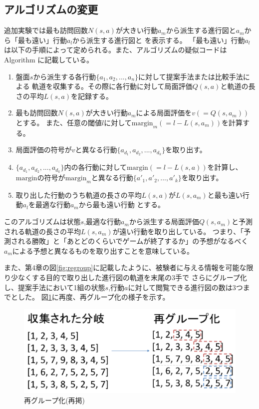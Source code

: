 \subsection{アルゴリズムの変更}
追加実験では最も訪問回数$N(s, a)$が大きい行動$a_m$から派生する進行図と$a_m$から「最も遠い」行動$a_l$から派生する進行図と
を表示する。
「最も遠い」行動$a_l$は以下の手順によって定められる。また、アルゴリズムの疑似コードはAlgorithm\label{alg:myalg-add} に記載している。
\begin{enumerate}
    \item 盤面$s$から派生する各行動$\{a_1, a_2, ..., a_n\}$に対して提案手法または比較手法による
    軌道を収集する。その際に各行動に対して局面評価$Q(s, a)$と軌道の長さの平均$L(s, a)$を記録する。
    \item 最も訪問回数$N(s, a)$が大きい行動$a_m$による局面評価を$v(=Q(s, a_m))$とする。
    また、任意の閾値$l$に対して$\textrm{margin}_m(=l-L(s, a_m))$を計算する。
    \item 局面評価の符号が$v$と異なる行動$\{a_{d_1}, a_{d_2}, ..., a_{d_k}\}$を取り出す。
    \item $\{a_{d_1}, a_{d_2}, ..., a_{d_k}\}$内の各行動に対して$\textrm{margin}(=l-L(s, a))$を計算し、
    $\textrm{margin}$の符号が$\textrm{margin}_m$と異なる行動$\{{a'}_{1}, {a'}_{2}, ..., {a'}_{k}\}$を取り出す。
    \item 取り出した行動のうち軌道の長さの平均$L(s, a)$が$L(s, a_m)$と最も遠い行動$a_l$を最適な行動$a_m$から最も遠い行動
    とする。
\end{enumerate}
このアルゴリズムは状態$s$,最適な行動$a_m$から派生する局面評価$Q(s, a_m)$と予測される軌道の長さの平均$L(s, a_m)$が遠い行動を取り出している。
つまり、「予測される勝敗」と「あとどのくらいでゲームが終了するか」の予想がなるべく$a_m$による予想と異なるものを取り出すことを意味している。

また、第4章の図\ref{fig:regroup}に記載したように、被験者に与える情報を可能な限り少なくする目的で取り出した進行図の軌道を末尾の3手で
さらにグループ化し、提案手法において1組の状態$s$,行動$a$に対して閲覧できる進行図の数は3つまでとした。
図\ref{fig:re-regroup}に再度、再グループ化の様子を示す。
\begin{figure}[t]
	\centering
	\includegraphics[width=\linewidth]{./figure/regroup.pdf}
	\caption{再グループ化(再掲)}
	\label{fig:re-regroup}
\end{figure}

